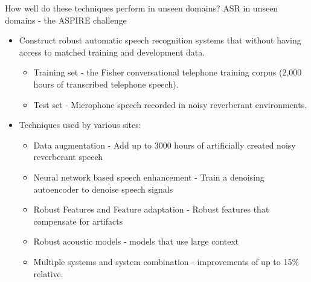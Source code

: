 \begin{frame} {How well do these techniques perform in unseen domains?}
{ASR in unseen domains - the ASPIRE challenge}

\begin{itemize}
\item Construct robust automatic speech recognition systems that \alert{without having access to matched training and
development data}.
\begin{itemize}
\item \alert{Training set}  - the Fisher conversational telephone training corpus (2,000 hours of transcribed telephone speech).
\item \alert{Test set} - Microphone speech recorded in noisy reverberant environments.
\end{itemize}
\item Techniques used by various sites:
\begin{itemize}
\item Data augmentation - Add up to 3000 hours of artificially created noisy reverberant speech
\item Neural network based speech enhancement - Train a denoising autoencoder to denoise speech signals
\item Robust Features and Feature adaptation - Robust features that compensate for artifacts
\item Robust acoustic models - models that use large context
\item Multiple systems and system combination - improvements of up to 15\% relative.
\end{itemize}
\end{itemize}
\end{frame}

